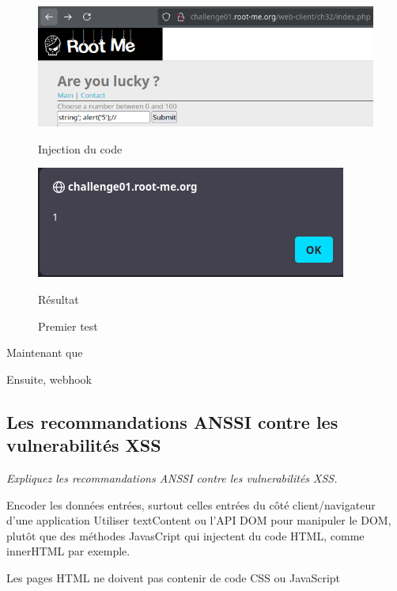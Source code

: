 \documentclass[12pt,a4paper]{article}
\begin{document}
\begin{figure}[!h]
    \centering
    \begin{minipage}{0.45\textwidth}
        \centering
        \includegraphics[scale=0.5]{xss_code_alert.png}
        \caption{Injection du code}
    \end{minipage}
    \begin{minipage}{0.45\textwidth}
        \centering
        \includegraphics[scale=0.5]{alert.png}
        \caption{Résultat}
    \end{minipage}
    \caption{Premier test}
\end{figure}

Maintenant que

Ensuite, webhook 
	\subsection{Les recommandations ANSSI contre les vulnerabilités XSS}
	
	\textit{Expliquez les recommandations ANSSI contre les vulnerabilités XSS.}
	
	Encoder les données entrées, surtout celles entrées du côté client/navigateur d'une application
	Utiliser textContent ou l'API DOM pour manipuler le DOM, plutôt que des méthodes JavasCript qui injectent du code HTML, comme innerHTML par exemple. 
	
	
	
	Les pages HTML ne doivent pas contenir de code CSS ou JavaScript 
	
	
\end{document}
